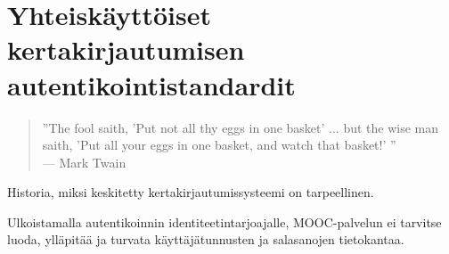 \documentclass[finnish,gradu]{tktltiki}
\begin{document}




\section{Yhteiskäyttöiset kertakirjautumisen autentikointistandardit} %
\label{sec:Kertakirjautumisstandardit}
  \begin{quote}
      ''The fool saith, 'Put not all thy eggs in one basket' ...
      but the wise man saith, 'Put all your eggs in one basket, and watch that basket!' ''
      \\--- Mark Twain~\cite{twain_eggs_1894}
  \end{quote}

  Historia, miksi keskitetty kertakirjautumissysteemi on tarpeellinen.

  Ulkoistamalla autentikoinnin identiteetintarjoajalle, MOOC-palvelun ei tarvitse luoda, ylläpitää ja turvata käyttäjätunnusten ja salasanojen tietokantaa.
\end{document}
